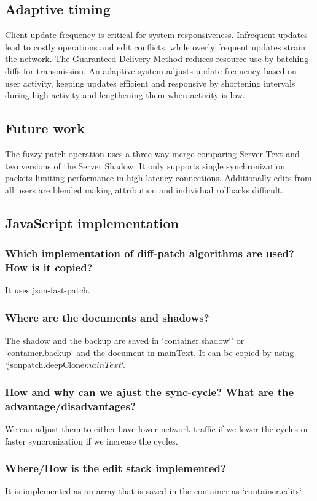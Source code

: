 \subsection{Adaptive timing}
Client update frequency is critical for system responsiveness. Infrequent updates lead to costly operations and edit conflicts, while overly frequent updates strain the network. The Guaranteed Delivery Method reduces resource use by batching diffs for transmission. An adaptive system adjusts update frequency based on user activity, keeping updates efficient and responsive by shortening intervals during high activity and lengthening them when activity is low.

\subsection{Future work}
The fuzzy patch operation uses a three-way merge comparing Server Text and two versions of the Server Shadow. It only supports single synchronization packets limiting performance in high-latency connections. Additionally edits from all users are blended making attribution and individual rollbacks difficult.

\subsection{JavaScript implementation}
\subsubsection{Which implementation of diff-patch algorithms are used? How is it copied?}
It uses json-fast-patch.

\subsubsection{Where are the documents and shadows?}
The shadow and the backup are saved in `container.shadow`' or `container.backup` and the document in mainText. 
It can be copied by using `jsonpatch.deepClone\(mainText\)`.

\subsubsection{How and why can we ajust the sync-cycle? What are the advantage/disadvantages?}
We can adjust them to either have lower network traffic if we lower the cycles or faster syncronization if we increase the cycles.

\subsubsection{Where/How is the edit stack implemented?}
It is implemented as an array that is saved in the container as `container.edits`.

